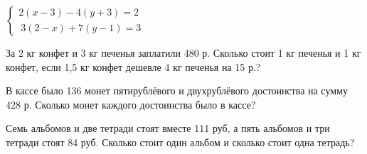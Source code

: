 \begin{class}[number=5]
\begin{listofex}
\begin{tasks}
			\task \( \begin{cases}
				2(x-3)-4(y+3)=2\\\ 3(2-x)+7(y-1)=3
			\end{cases} \)
		\end{tasks}
		\item  За 2 кг конфет и 3 кг печенья заплатили 480 р. Сколько стоит 1 кг печенья  и 1 кг конфет, если 1,5 кг конфет дешевле 4 кг печенья на 15 р.?
		\item  В кассе было 136 монет пятирублёвого и  двухрублёвого достоинства на сумму 428 р. Сколько монет каждого достоинства было в кассе?
		\item Семь альбомов и две тетради стоят вместе 111 руб, а пять альбомов и три тетради стоят 84 руб. Сколько стоит один альбом и сколько стоит одна тетрадь?
	\end{listofex}
\end{class}

